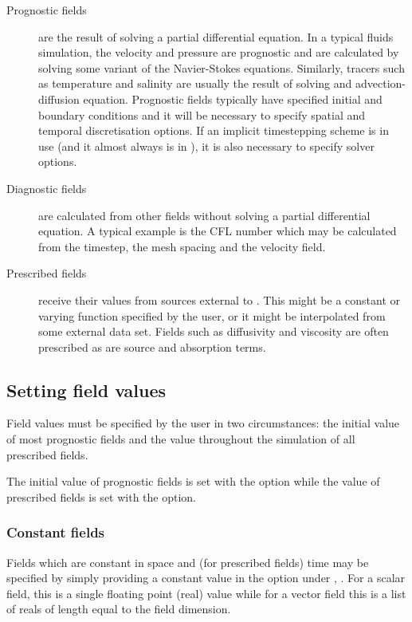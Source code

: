 \begin{description}
\item[Prognostic fields] are the result of solving a partial differential
  equation. In a typical fluids simulation, the velocity and pressure are
  prognostic and are calculated by solving some variant of the Navier-Stokes
  equations. Similarly, tracers such as temperature and salinity are usually
  the result of solving and advection-diffusion equation. Prognostic fields
  typically have specified initial and boundary conditions and it will be
  necessary to specify spatial and temporal discretisation options. If an
  implicit timestepping scheme is in use (and it almost always is in
  \fluidity), it is also necessary to specify solver options. 
\item[Diagnostic fields] are calculated from other fields without solving a
  partial differential equation. A typical example is the CFL number which
  may be calculated from the timestep, the mesh spacing and the velocity
  field. 
\item[Prescribed fields] receive their values from sources external to
  \fluidity. This might be a constant or varying function specified by the
  user, or it might be interpolated from some external data set. Fields such
  as diffusivity and viscosity are often prescribed as are source and
  absorption terms.
\end{description}


\subsection{Setting field values}\label{Sect:setting_field_values}
Field values must be specified by the user in two circumstances: the initial
value of most prognostic fields and the value throughout the simulation of
all prescribed fields. 

The initial value of prognostic fields is set with the
 option while the value of
prescribed fields is set with the  option.


\subsubsection{Constant fields}
Fields which are constant in space and (for prescribed fields) time may be
specified by simply providing a constant value in the 
option under ,
. For a scalar field, this is a single
floating point (real) value while for a vector field this is a list of reals
of length equal to the field dimension.


